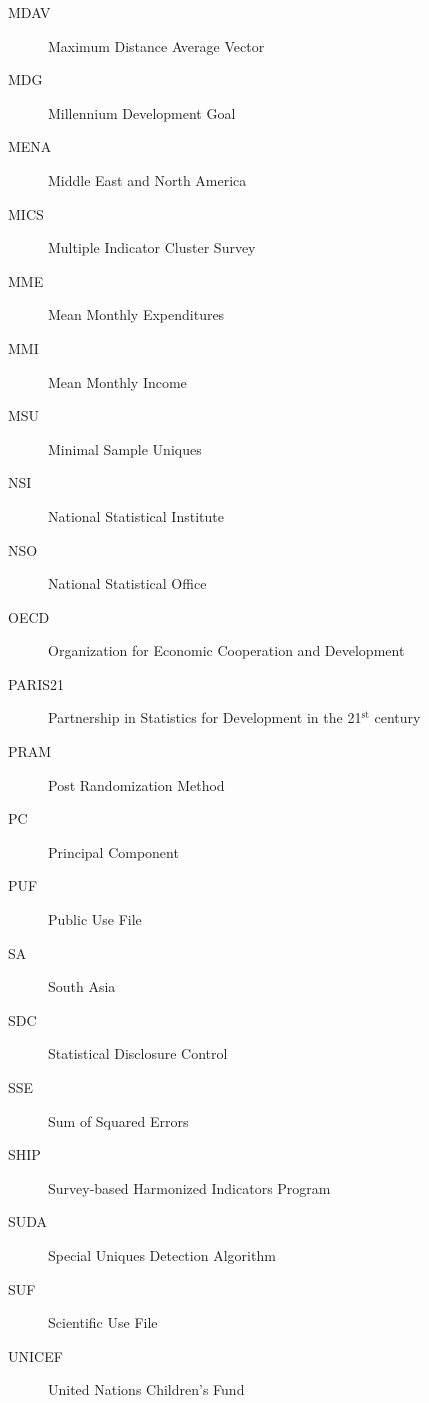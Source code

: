 \documentclass[letterpaper,10pt,english]{sphinxmanual}
\begin{document}
\begin{description}
\item[{MDAV}] \leavevmode
Maximum Distance Average Vector

\item[{MDG}] \leavevmode
Millennium Development Goal

\item[{MENA}] \leavevmode
Middle East and North America

\item[{MICS}] \leavevmode
Multiple Indicator Cluster Survey

\item[{MME}] \leavevmode
Mean Monthly Expenditures

\item[{MMI}] \leavevmode
Mean Monthly Income

\item[{MSU}] \leavevmode
Minimal Sample Uniques

\item[{NSI}] \leavevmode
National Statistical Institute

\item[{NSO}] \leavevmode
National Statistical Office

\item[{OECD}] \leavevmode
Organization for Economic Cooperation and Development

\item[{PARIS21}] \leavevmode
Partnership in Statistics for Development in the 21$^{\text{st}}$ century

\item[{PRAM}] \leavevmode
Post Randomization Method

\item[{PC}] \leavevmode
Principal Component

\item[{PUF}] \leavevmode
Public Use File

\item[{SA}] \leavevmode
South Asia

\item[{SDC}] \leavevmode
Statistical Disclosure Control

\item[{SSE}] \leavevmode
Sum of Squared Errors

\item[{SHIP}] \leavevmode
Survey-based Harmonized
Indicators Program

\item[{SUDA}] \leavevmode
Special Uniques Detection Algorithm

\item[{SUF}] \leavevmode
Scientific Use File

\item[{UNICEF}] \leavevmode
United Nations Children’s Fund

\end{description}
\end{document}

